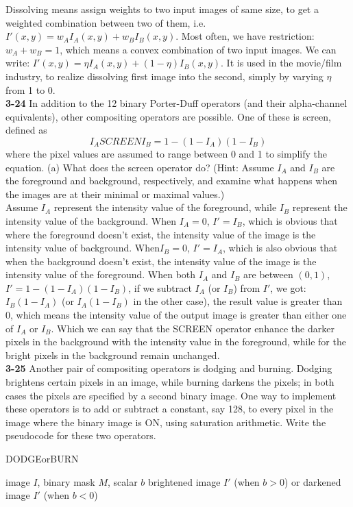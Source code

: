 \documentclass[a4paper]{article}
\begin{document}
\begin{spacing}{2.0}
	Dissolving means assign weights to two input images of same size, to get a weighted combination between two of them, i.e. $I'(x,y) = w_AI_A(x,y) + w_BI_B(x,y)$. Most often, we have 		restriction: $w_A+w_B = 1$, which means a convex combination of two input images. We can write: $I'(x,y) = \eta I_A(x,y) + (1-\eta)I_B(x,y)$. It is used in the movie/film industry, to realize dissolving first image into the second, simply by varying $\eta$ from 1 to 0.\\
	
	\noindent
	\textbf{3-24} In addition to the 12 binary Porter-Duff operators (and their alpha-channel equivalents), other compositing operators are possible. One of these is screen, defined as
	$$I_A SCREEN I_B = 1 - (1-I_A)(1-I_B)$$
	where the pixel values are assumed to range between 0 and 1 to simplify the equation.
	(a) What does the screen operator do? (Hint: Assume $I_A$ and $I_B$ are the foreground and background, respectively, and examine what happens when the images are at their 	minimal or maximal values.)\\

	Assume $I_A$ represent the intensity value of the foreground, while $I_B$ represent the intensity value of the background. When $I_A = 0$, $I' = I_B$, which is obvious that where the foreground doesn't exist, the intensity value of the image is the intensity value of background. When$I_B= 0$, $I' = I_A$, which is also obvious that when the background doesn't exist, the intensity value of the image is the intensity value of the foreground. When both $I_A$ and $I_B$ are between $(0, 1)$, $I' = 1-(1-I_A)(1-I_B)$, if we subtract $I_A$ (or $I_B$) from $I'$, we got: $I_B(1-I_A)$ (or $I_A(1-I_B)$ in the other case), the result value is greater than 0, which means the intensity value of the output image is greater than either one of $I_A$ or $I_B$. Which we can say that the SCREEN operator enhance the darker pixels in the background with the intensity value in the foreground, while for the bright pixels in the background remain unchanged.\\
	
	\noindent
	\textbf{3-25} Another pair of compositing operators is dodging and burning. Dodging brightens certain pixels in an image, while burning darkens the pixels; in both cases the pixels are specified by a second binary image. One way to implement these operators is to add or subtract a constant, say 128, to every pixel in the image where the binary image is ON, using saturation arithmetic. Write the pseudocode for these two operators.\\
	\begin{algorithm}
        \caption{DODGEorBURN}
        \begin{algorithmic}[1] %
            \Require image $I$, binary mask $M$, scalar $b$
            \Ensure brightened image $I'$ (when $b>0$) or darkened image $I'$ (when $b<0$)
		\EndIf
	    \EndFor
          \end{algorithmic}
        \end{algorithm}
	

\end{spacing}
\end{document}
